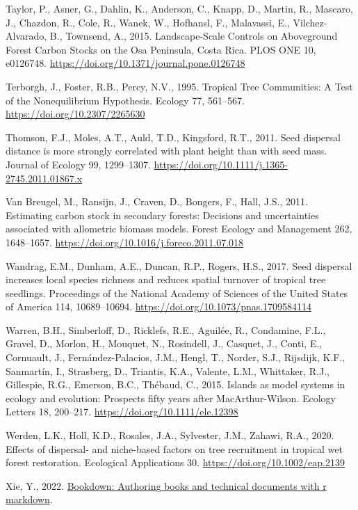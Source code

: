 \documentclass[
  12pt,
]{article}
\newlength{\cslhangindent}
\newlength{\cslentryspacingunit} %
\newenvironment{CSLReferences}[2] %
 {%
  \setlength{\parindent}{0pt}
  \ifodd #1
  \let\oldpar\par
  \def\par{\hangindent=\cslhangindent\oldpar}
  \fi
  \setlength{\parskip}{#2\cslentryspacingunit}
 }%
 {}
\begin{document}
\begin{CSLReferences}{1}{0}
\leavevmode{}%
Taylor, P., Asner, G., Dahlin, K., Anderson, C., Knapp, D., Martin, R., Mascaro, J., Chazdon, R., Cole, R., Wanek, W., Hofhansl, F., Malavassi, E., Vilchez-Alvarado, B., Townsend, A., 2015. Landscape-{Scale Controls} on {Aboveground Forest Carbon Stocks} on the {Osa Peninsula}, {Costa Rica}. PLOS ONE 10, e0126748. \url{https://doi.org/10.1371/journal.pone.0126748}

\leavevmode{}%
Terborgh, J., Foster, R.B., Percy, N.V., 1995. Tropical {Tree Communities}: {A Test} of the {Nonequilibrium Hypothesis}. Ecology 77, 561--567. \url{https://doi.org/10.2307/2265630}

\leavevmode{}%
Thomson, F.J., Moles, A.T., Auld, T.D., Kingsford, R.T., 2011. Seed dispersal distance is more strongly correlated with plant height than with seed mass. Journal of Ecology 99, 1299--1307. \url{https://doi.org/10.1111/j.1365-2745.2011.01867.x}

\leavevmode{}%
Van Breugel, M., Ransijn, J., Craven, D., Bongers, F., Hall, J.S., 2011. Estimating carbon stock in secondary forests: {Decisions} and uncertainties associated with allometric biomass models. Forest Ecology and Management 262, 1648--1657. \url{https://doi.org/10.1016/j.foreco.2011.07.018}

\leavevmode{}%
Wandrag, E.M., Dunham, A.E., Duncan, R.P., Rogers, H.S., 2017. Seed dispersal increases local species richness and reduces spatial turnover of tropical tree seedlings. Proceedings of the National Academy of Sciences of the United States of America 114, 10689--10694. \url{https://doi.org/10.1073/pnas.1709584114}

\leavevmode{}%
Warren, B.H., Simberloff, D., Ricklefs, R.E., Aguilée, R., Condamine, F.L., Gravel, D., Morlon, H., Mouquet, N., Rosindell, J., Casquet, J., Conti, E., Cornuault, J., Fernández-Palacios, J.M., Hengl, T., Norder, S.J., Rijsdijk, K.F., Sanmartín, I., Strasberg, D., Triantis, K.A., Valente, L.M., Whittaker, R.J., Gillespie, R.G., Emerson, B.C., Thébaud, C., 2015. Islands as model systems in ecology and evolution: Prospects fifty years after {MacArthur-Wilson}. Ecology Letters 18, 200--217. \url{https://doi.org/10.1111/ele.12398}

\leavevmode{}%
Werden, L.K., Holl, K.D., Rosales, J.A., Sylvester, J.M., Zahawi, R.A., 2020. Effects of dispersal- and niche-based factors on tree recruitment in tropical wet forest restoration. Ecological Applications 30. \url{https://doi.org/10.1002/eap.2139}

\leavevmode{}%
Xie, Y., 2022. \href{https://github.com/rstudio/bookdown}{Bookdown: Authoring books and technical documents with r markdown}.

\end{CSLReferences}
\end{document}
